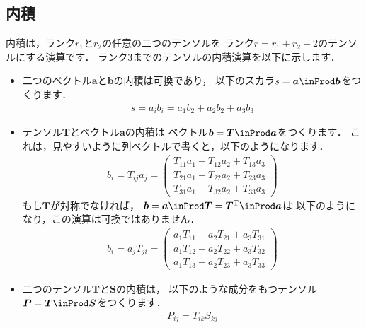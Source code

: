 \subsection{内積}
\label{ssec:1.3.1}
%
内積は，ランク$r_{1}$と$r_{2}$の任意の二つのテンソルを
ランク$r = r_{1} + r_{2} - 2$のテンソルにする演算です．
ランク3までのテンソルの内積演算を以下に示します．
\begin{itemize}
 \item 二つのベクトル$\bm{a}$と$\bm{b}$の内積は可換であり，
       以下のスカラ$s = \bm{a} \inProd \bm{b}$をつくります．
       \begin{align}
        \label{eq:1.7}
        s = a_{i}b_{i} = a_{1}b_{2} + a_{2}b_{2} + a_{3}b_{3}
       \end{align}
 \item テンソル$\bm{T}$とベクトル$\bm{a}$の内積は
       ベクトル$\bm{b} = \bm{T} \inProd \bm{a}$をつくります．
       これは，見やすいように列ベクトルで書くと，以下のようになります．
       \begin{align}
        \label{eq:1.8}
        b_{i} = T_{ij}a_{j} =
        \begin{pmatrix}
         T_{11}a_{1} + T_{12}a_{2} + T_{13}a_{3} \\
         T_{21}a_{1} + T_{22}a_{2} + T_{23}a_{3} \\
         T_{31}a_{1} + T_{32}a_{2} + T_{33}a_{3}
        \end{pmatrix}
       \end{align}
       もし$\bm{T}$が対称でなければ，
       $\bm{b} = \bm{a} \inProd \bm{T} = \bm{T}^{\mathrm{T}} \inProd \bm{a}$は
       以下のようになり，この演算は可換ではありません．
       \begin{align}
        \label{eq:1.9}
        b_{i} = a_{j}T_{ji} =
        \begin{pmatrix}
         a_{1}T_{11} + a_{2}T_{21} + a_{3}T_{31} \\
         a_{1}T_{12} + a_{2}T_{22} + a_{3}T_{32} \\
         a_{1}T_{13} + a_{2}T_{23} + a_{3}T_{33}
        \end{pmatrix}
       \end{align}
 \item 二つのテンソル$\bm{T}$と$\bm{S}$の内積は，
       以下のような成分をもつテンソル$\bm{P} = \bm{T} \inProd \bm{S}$をつくります．
       \begin{align}
        \label{eq:1.10}
        P_{ij} = T_{ik}S_{kj}
       \end{align}

\end{itemize}
